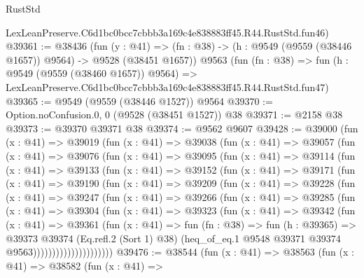 \begin{lexlean}{RustStd}
\begin{coremodule}
    LexLeanPreserve.C6d1bc0bcc7cbbb3a169c4e838883ff45.R44.RustStd.fun46)
@39361 := @38436
    (fun (y : @41) =>
    (fn : @38) -> (h : @9549 (@9559 (@38446 @1657)) @9564) -> @9528 (@38451 @1657))
    @9563
    (fun (fn : @38) =>
    fun (h : @9549 (@9559 (@38460 @1657)) @9564) =>
    LexLeanPreserve.C6d1bc0bcc7cbbb3a169c4e838883ff45.R44.RustStd.fun47)
@39365 := @9549 (@9559 (@38446 @1527)) @9564
@39370 := Option.noConfusion.{0, 0} (@9528 (@38451 @1527)) @38
@39371 := @2158 @38
@39373 := @39370 @39371 @38
@39374 := @9562 @9607
@39428 := @39000
    (fun (x : @41) =>
    @39019
      (fun (x : @41) =>
      @39038
        (fun (x : @41) =>
        @39057
          (fun (x : @41) =>
          @39076
            (fun (x : @41) =>
            @39095
              (fun (x : @41) =>
              @39114
                (fun (x : @41) =>
                @39133
                  (fun (x : @41) =>
                  @39152
                    (fun (x : @41) =>
                    @39171
                      (fun (x : @41) =>
                      @39190
                        (fun (x : @41) =>
                        @39209
                          (fun (x : @41) =>
                          @39228
                            (fun (x : @41) =>
                            @39247
                              (fun (x : @41) =>
                              @39266
                                (fun (x : @41) =>
                                @39285
                                  (fun (x : @41) =>
                                  @39304
                                    (fun (x : @41) =>
                                    @39323
                                      (fun (x : @41) =>
                                      @39342
                                        (fun (x : @41) =>
                                        @39361
                                          (fun (x : @41) =>
                                          fun (fn : @38) =>
                                          fun (h : @39365) =>
                                          @39373
                                            @39374
                                            (Eq.refl.{2} (Sort 1) @38)
                                            (heq_of_eq.{1}
                                              @9548
                                              @39371
                                              @39374
                                              @9563)))))))))))))))))))))
@39476 := @38544
    (fun (x : @41) =>
    @38563
      (fun (x : @41) =>
      @38582
        (fun (x : @41) =>

\end{coremodule}
\end{lexlean}
